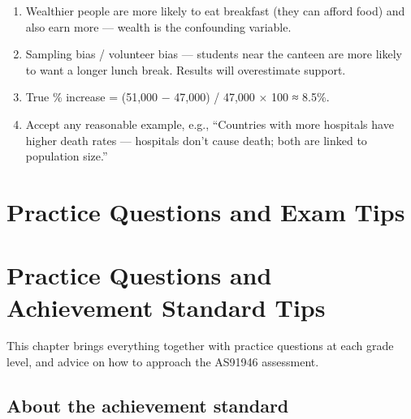 \documentclass[
  11pt,
  a4paper,
  oneside,
  open=any]{scrbook}
\providecommand{\tightlist}{%
  \setlength{\itemsep}{0pt}\setlength{\parskip}{0pt}}
\begin{document}
\begin{tcolorbox}[enhanced jigsaw, breakable, leftrule=.75mm, bottomtitle=1mm, bottomrule=.15mm, titlerule=0mm, left=2mm, opacitybacktitle=0.6, coltitle=black, colbacktitle=quarto-callout-note-color!10!white, rightrule=.15mm, title=\textcolor{quarto-callout-note-color}{\faInfo}\hspace{0.5em}{Answers}, toptitle=1mm, arc=.35mm, colback=white, toprule=.15mm, colframe=quarto-callout-note-color-frame, opacityback=0]

\begin{enumerate}
\def\labelenumi{\arabic{enumi}.}
\tightlist
\item
  Wealthier people are more likely to eat breakfast (they can afford
  food) and also earn more --- wealth is the confounding variable.
\item
  Sampling bias / volunteer bias --- students near the canteen are more
  likely to want a longer lunch break. Results will overestimate
  support.
\item
  True \% increase = (51,000 − 47,000) / 47,000 × 100 ≈ 8.5\%.
\item
  Accept any reasonable example, e.g., ``Countries with more hospitals
  have higher death rates --- hospitals don't cause death; both are
  linked to population size.''
\end{enumerate}

\end{tcolorbox}


\chapter{Practice Questions and Exam
Tips}\label{practice-questions-and-exam-tips}


\chapter{Practice Questions and Achievement Standard
Tips}\label{sec-practice}

This chapter brings everything together with practice questions at each
grade level, and advice on how to approach the AS91946 assessment.

\section{About the achievement
standard}\label{about-the-achievement-standard}
\end{document}
